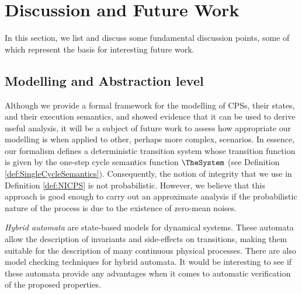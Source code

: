 {%

\section{Discussion and Future Work}
\label{sec:Discussion}
In this section, we list and discuss some fundamental discussion points, some of which represent the basis for interesting future work. 

{\color{red}
\subsection{Modelling and Abstraction level}
Although we provide a formal framework for the modelling of CPSs, their states, and their execution semantics, and showed evidence that it can be used to derive useful analysis, it will be a subject of future work to assess how appropriate our modelling is when applied to other, perhaps more complex, scenarios. In essence, our formalism defines a deterministic transition system whose transition function is given by the one-step cycle semantics function $\TheSystem$ (see Definition \ref{def:SingleCycleSemantics}). Consequently, the notion of integrity that we use in Definition \ref{def:NICPS} is not probabilistic. However, we believe that this approach is good enough to carry out an approximate analysis if the probabilistic nature of the process is due to the existence of zero-mean noises.

\emph{Hybrid automata} \cite{ALUR19953} are state-based models for dynamical systems. These automata allow the description of invariants and side-effects on transitions, making them suitable for the description of many continuous physical processes. There are also model checking techniques for hybrid automata. It would be interesting to see if these automata provide any advantages when it comes to automatic verification of the proposed properties.

}}
